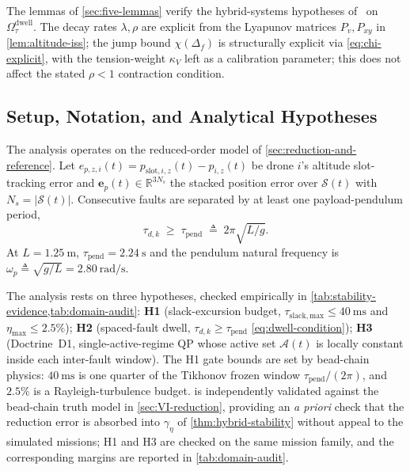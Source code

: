\documentclass[lettersize,journal]{IEEEtran}
\newcommand{\R}{\mathbb{R}}
\newcommand{\vect}[1]{\boldsymbol{#1}}
\begin{document}
The lemmas of \cref{sec:five-lemmas} verify the hybrid-systems hypotheses of~\cite{GoebelSanfeliceTeel2012} on $\Omega_\tau^{\mathrm{dwell}}$. The decay rates $\lambda,\rho$ are explicit from the Lyapunov matrices $P_v,P_{xy}$ in \cref{lem:altitude-iss}; the jump bound $\chi(\Delta_f)$ is structurally explicit via \eqref{eq:chi-explicit}, with the tension-weight $\kappa_V$ left as a calibration parameter; this does not affect the stated $\rho<1$ contraction condition.

\subsection{Setup, Notation, and Analytical Hypotheses}
\label{sec:stability-setup}

The analysis operates on the reduced-order model of
\cref{sec:reduction-and-reference}. Let
$e_{p,z,i}(t) = p_{\mathrm{slot},i,z}(t) - p_{i,z}(t)$ be
drone $i$'s altitude slot-tracking error and
$\vect{e}_p(t) \in \R^{3N_s}$ the stacked position error over
$\mathcal{S}(t)$ with $N_s = |\mathcal{S}(t)|$. Consecutive faults are separated by at least one
payload-pendulum period,
\begin{equation}
  \tau_{d,k} \;\ge\; \tau_{\mathrm{pend}}
    \;\triangleq\; 2\pi\sqrt{L/g}.
  \label{eq:dwell-condition}
\end{equation}
At $L = \SI{1.25}{\metre}$, $\tau_{\mathrm{pend}} =
\SI{2.24}{\second}$ and the pendulum natural frequency is
$\omega_p \triangleq \sqrt{g/L} = \SI{2.80}{\radian\per\second}$.

The analysis rests on three hypotheses, checked empirically in \cref{tab:stability-evidence,tab:domain-audit}: \textbf{H1} (slack-excursion budget, $\tau_{\mathrm{slack,max}}\le\SI{40}{\milli\second}$ and $\eta_{\max}\le 2.5\%$); \textbf{H2} (spaced-fault dwell, $\tau_{d,k}\ge\tau_{\mathrm{pend}}$ \eqref{eq:dwell-condition}); \textbf{H3} (Doctrine~D1, single-active-regime QP whose active set $\mathcal{A}(t)$ is locally constant inside each inter-fault window). The H1 gate bounds are set by bead-chain physics: $\SI{40}{\milli\second}$ is one quarter of the Tikhonov frozen window $\tau_{\mathrm{pend}}/(2\pi)$, and $2.5\%$ is a Rayleigh-turbulence budget.  is independently validated against the bead-chain truth model in \cref{sec:VI-reduction}, providing an \emph{a priori} check that the reduction error is absorbed into $\gamma_\eta$ of \cref{thm:hybrid-stability} without appeal to the simulated missions; H1 and H3 are checked on the same mission family, and the corresponding margins are reported in \cref{tab:domain-audit}.
\end{document}
